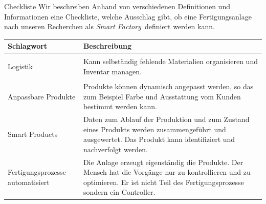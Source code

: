 \documentclass{article}
\def\SmartFactory{\textcolor{DarkestGray}{\textit{Smart Factory}}}
\begin{document}
\begin{Map}{Checkliste}\label{map:CheckListe}
Wir beschreiben Anhand von verschiedenen Definitionen und Informationen eine Checkliste, welche Ausschlag gibt, ob eine Fertigungsanlage nach unseren Recherchen als \SmartFactory\ definiert werden kann.

\begin{tabular}{p{2.5cm}p{8cm}}\toprule
	Schlagwort 
	& Beschreibung \\\midrule
	
	\hypertarget{CheckListe:Logistik}{Logistik}
	& Kann selbständig fehlende Materialien organisieren und Inventar managen.\cite{WasIndustrie40} \\\midrule
	
	\hypertarget{CheckListe:AnpassbareProdukte}{Anpassbare Produkte}
	& Produkte können dynamisch angepasst werden, so das zum Beispiel Farbe und Ausstattung vom Kunden bestimmt werden kann.\cite{WasIndustrie40} \\\midrule
	
	\hypertarget{CheckListe:SmartProduct}{Smart Products}
	& Daten zum Ablauf der Produktion und zum Zustand eines Produkts werden zusammengeführt und ausgewertet. Das Produkt kann identifiziert und nachverfolgt werden. \cite{Industrie40TippsUmsetzung} \\\midrule
	
	\hypertarget{CheckListe:Fertigungsprozess}{Fertigungsprozesse automatisiert}
	& Die Anlage erzeugt eigenständig die Produkte. Der Mensch hat die Vorgänge nur zu kontrollieren und zu optimieren. Er ist nicht Teil des Fertigungsprozesse sondern ein Controller.\cite{REFA}\\\bottomrule
	
\end{tabular}
\end{Map}
\end{document}
